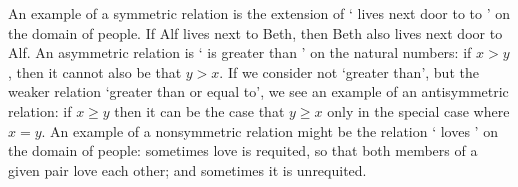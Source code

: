 \begin{earg}
 An example of a symmetric relation is the extension of ` lives next door to to ' on the domain of people. If Alf lives next to Beth, then Beth also lives next door to Alf. An asymmetric relation is ` is greater than ' on the natural numbers: if $x>y$, then it cannot also be that $y > x$. If we consider not `greater than', but the weaker relation `greater than or equal to', we see an example of an antisymmetric relation: if $x≥y$ then it can be the case that $y≥x$ only in the special case where $x=y$. An example of a nonsymmetric relation might be the relation ` loves ' on the domain of people: sometimes love is requited, so that both members of a given pair love each other; and sometimes it is unrequited.


\end{earg}
